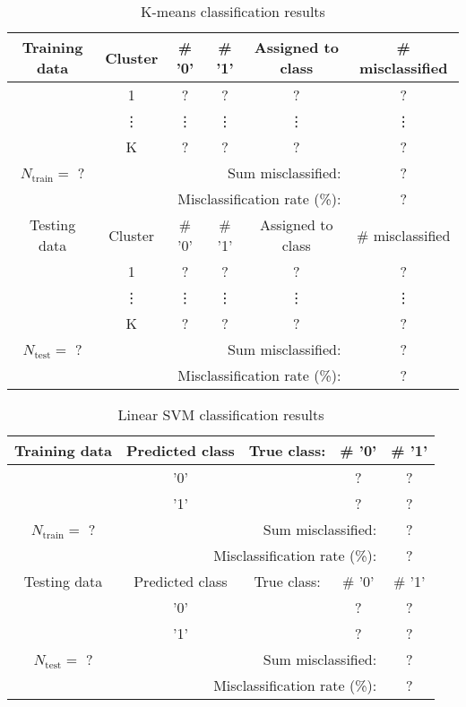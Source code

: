 \documentclass[a4paper,11pt]{article}
\begin{document}
\begin{table}[ht]
\caption{K-means classification results}
\centering
\begin{tabular}{c | c c c c | c }
\hline\hline
Training data & Cluster & \# '0' & \# '1'  & Assigned to class & \# misclassified \\ [0.5ex] %
\hline
& 1 & ? & ? & ? & ? \\
& \vdots &  \vdots& \vdots & \vdots  & \vdots \\  
& K & ?  & ? & ? & ?\\ 
\hline 
$N_\text{train} = $ ?  & \multicolumn{4}{r}{Sum misclassified:} & ? \\ [.5ex]
\hline 
 & \multicolumn{4}{r}{Misclassification rate (\%):} & ?\\ [.5ex]
\hline\hline
%
%
Testing data & Cluster & \# '0' & \# '1'  & Assigned to class & \# misclassified \\ [0.5ex] %
\hline
& 1 & ? & ? & ? & ? \\
& \vdots &  \vdots& \vdots & \vdots  & \vdots \\  
& K & ?  & ? & ? & ?\\ 
\hline 
$N_\text{test} = $ ?  & \multicolumn{4}{r}{Sum misclassified:} & ? \\ [.5ex]
\hline 
 & \multicolumn{4}{r}{Misclassification rate (\%):} & ?\\ [.5ex]
\hline\hline
%
\end{tabular}
\label{table:kmeanstable}
\end{table}
%




\vspace{1em}
\begin{table}[ht]
\caption{Linear SVM classification results}
\centering
\begin{tabular}{c | c | c c c}
\hline\hline
Training data & Predicted class & True class: & \# '0' & \# '1' \\ [0.5ex] %
\hline
& '0' & & ? & ? \\
& '1' & & ? & ?\\ 
\hline 
$N_\text{train} = $ ?  & \multicolumn{3}{r}{Sum misclassified: } & ? \\ [.5ex]
\hline 
 & \multicolumn{3}{r}{Misclassification rate (\%):} & ? \\ [.5ex]
\hline\hline
%
Testing data & Predicted class & True class: & \# '0' & \# '1' \\ [0.5ex] %
\hline
& '0' & & ? & ? \\
& '1' & & ? & ?\\ 
\hline 
$N_\text{test} = $ ?  & \multicolumn{3}{r}{Sum misclassified:} & ?  \\ [.5ex]
\hline 
 & \multicolumn{3}{r}{Misclassification rate (\%): } &? \\ [.5ex]
\hline\hline
%
\end{tabular}
\label{table:svmtable}
\end{table}
%
\vspace{1em}
\end{document}
